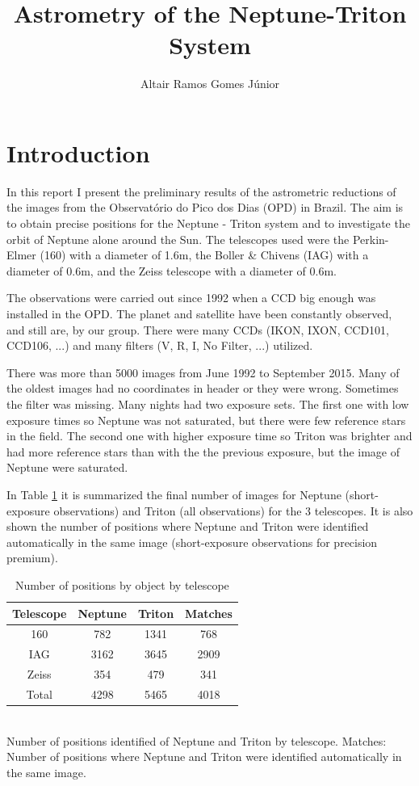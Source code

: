 \documentclass[12pt,a4paper]{report}
\author{Altair Ramos Gomes Júnior}
\title{Astrometry of the Neptune-Triton System}
\newcommand{\PE}{Perkin-Elmer }
\newcommand{\BC}{Boller \& Chivens }
\begin{document}
\maketitle

\pagestyle{headings}

\section*{Introduction}

In this report I present the preliminary results of the astrometric reductions of the images from the Observatório do Pico dos Dias (OPD) in Brazil. The aim is to obtain precise positions for the Neptune - Triton system and to investigate the orbit of Neptune alone around the Sun. The telescopes used were the \PE (160) with a diameter of 1.6m, the \BC (IAG) with a diameter of 0.6m, and the Zeiss telescope with a diameter of 0.6m.

The observations were carried out since 1992 when a CCD big enough was installed in the OPD. The planet and satellite have been constantly observed, and still are, by our group. There were many CCDs (IKON, IXON, CCD101, CCD106, ...) and many filters (V, R, I, No Filter, ...) utilized.

There was more than 5000 images from June 1992 to September 2015. Many of the oldest images had no coordinates in header or they were wrong. Sometimes the filter was missing. Many nights had two exposure sets. The first one with low exposure times so Neptune was not saturated, but there were few reference stars in the field. The second one with higher exposure time so Triton was brighter and had more reference stars than with the the previous exposure, but the image of Neptune were saturated.

In Table \ref{Tab:dados} it is summarized the final number of images for Neptune (short-exposure observations) and Triton (all observations) for the 3 telescopes. It is also shown the number of positions where Neptune and Triton were identified automatically in the same image (short-exposure observations for precision premium).

\begin{table}[h]
\centering
\caption{Number of positions by object by telescope}
\label{Tab:dados}
\begin{tabular}{|c|c|c|c|}
\hline 
Telescope & Neptune & Triton & Matches \\ 
\hline
160 & 782 & 1341 & 768 \\ 
\hline 
IAG & 3162 & 3645 & 2909 \\ 
\hline 
Zeiss & 354 & 479 & 341 \\ 
\hline 
Total & 4298 & 5465 & 4018 \\ 
\hline 
\end{tabular}
\\Number of positions identified of Neptune and Triton by telescope. Matches: Number of positions where Neptune and Triton were identified automatically in the same image.
\end{table}
\end{document}
